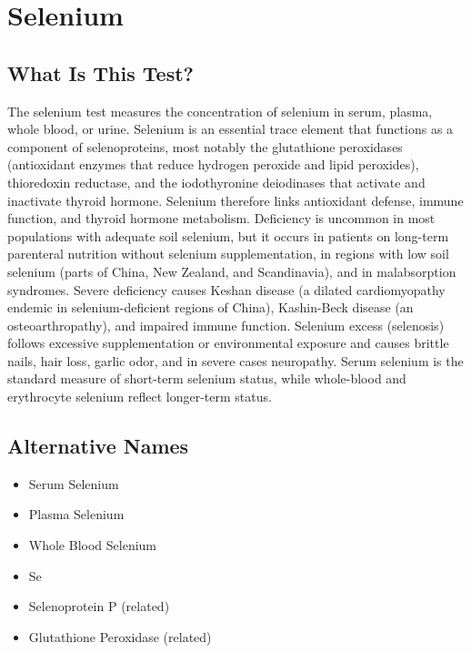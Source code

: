 \chapter{Selenium}

\section*{What Is This Test?}
The selenium test measures the concentration of selenium in serum, plasma, whole blood, or urine. Selenium is an essential trace element that functions as a component of selenoproteins, most notably the glutathione peroxidases (antioxidant enzymes that reduce hydrogen peroxide and lipid peroxides), thioredoxin reductase, and the iodothyronine deiodinases that activate and inactivate thyroid hormone. Selenium therefore links antioxidant defense, immune function, and thyroid hormone metabolism. Deficiency is uncommon in most populations with adequate soil selenium, but it occurs in patients on long-term parenteral nutrition without selenium supplementation, in regions with low soil selenium (parts of China, New Zealand, and Scandinavia), and in malabsorption syndromes. Severe deficiency causes Keshan disease (a dilated cardiomyopathy endemic in selenium-deficient regions of China), Kashin-Beck disease (an osteoarthropathy), and impaired immune function. Selenium excess (selenosis) follows excessive supplementation or environmental exposure and causes brittle nails, hair loss, garlic odor, and in severe cases neuropathy. Serum selenium is the standard measure of short-term selenium status, while whole-blood and erythrocyte selenium reflect longer-term status.

\section*{Alternative Names}
\begin{itemize}
  \item Serum Selenium
  \item Plasma Selenium
  \item Whole Blood Selenium
  \item Se
  \item Selenoprotein P (related)
  \item Glutathione Peroxidase (related)
\end{itemize}
